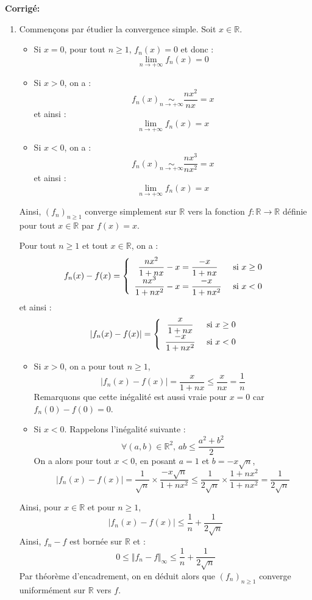 \documentclass[a4paper,twoside,french,11pt]{VcCours}
\newcommand{\corr}{\textbf{Corrigé:}}
\begin{document}
\corr \begin{enumerate}
\item Commençons par étudier la convergence simple. Soit $x \in \mathbb{R}$.
\begin{itemize}
\item Si $x=0$, pour tout $n \geq 1$, $f_n(x)=0$ et donc :
$$ \lim_{n \rightarrow + \infty} f_n(x)=0$$
\item Si $x>0$, on a :
$$ f_n(x) \underset{n \rightarrow + \infty}{\sim} \dfrac{nx^2}{nx} = x$$
et ainsi :
$$ \lim_{n \rightarrow + \infty} f_n(x)=x$$
\item Si $x<0$, on a :
$$ f_n(x) \underset{n \rightarrow + \infty}{\sim} \dfrac{nx^3}{nx^2} = x$$
et ainsi :
$$ \lim_{n \rightarrow + \infty} f_n(x)=x$$
\end{itemize}
Ainsi, $(f_n)_{n \geq 1}$ converge simplement sur $\mathbb{R}$ vers la fonction $f : \mathbb{R} \rightarrow \mathbb{R}$ définie pour tout $x \in \mathbb{R}$ par $f(x)=x$.

\medskip

Pour tout $n \geq 1$ et tout $x \in \mathbb{R}$, on a :
$$ f_n(x)-f(x)= \left\lbrace \begin{array}{cl}
\dfrac{nx^2}{1+nx}-x = \dfrac{-x}{1+nx} & \hbox{ si } x \geq 0 \\
\dfrac{nx^3}{1+nx^2}-x =  \dfrac{-x}{1+nx^2}& \hbox{ si } x < 0 \\
\end{array}\right.$$
et ainsi :
$$ \vert f_n(x)-f(x) \vert = \left\lbrace \begin{array}{cl}
 \dfrac{x}{1+nx} & \hbox{ si } x \geq 0 \\
 \dfrac{-x}{1+nx^2}& \hbox{ si } x < 0 \\
\end{array}\right.$$
\begin{itemize}
\item Si $x > 0$, on a pour tout $n \geq 1$,
$$  \vert f_n(x)-f(x) \vert = \dfrac{x}{1+nx} \leq \dfrac{x}{nx} = \dfrac{1}{n}$$
Remarquons que cette inégalité est aussi vraie pour $x=0$ car $f_n(0)-f(0)=0$.
\item Si $x<0$. Rappelons l'inégalité suivante :
$$ \forall (a,b) \in \mathbb{R}^2, \, ab \leq \dfrac{a^2+b^2}{2}$$
On a alors pour tout $x<0$, en posant $a=1$ et $b=-x \sqrt{n}$,
$$ \vert f_n(x)-f(x) \vert = \dfrac{1}{\sqrt{n}} \times \dfrac{ -x \sqrt{n}}{1+nx^2} \leq \dfrac{1}{2\sqrt{n}} \times \dfrac{1+nx^2}{1+nx^2} = \dfrac{1}{2\sqrt{n}}$$
\end{itemize}
Ainsi, pour $x \in \mathbb{R}$ et pour $n \geq 1$, 
$$  \vert f_n(x)-f(x) \vert \leq \dfrac{1}{n} + \dfrac{1}{2\sqrt{n}}$$
Ainsi, $f_n-f$ est bornée sur $\mathbb{R}$ et :
$$ 0 \leq \Vert f_n-f \Vert_{\infty} \leq \dfrac{1}{n} + \dfrac{1}{2\sqrt{n}}$$
Par théorème d'encadrement, on en déduit alors que $(f_n)_{n \geq 1}$ converge uniformément sur $\mathbb{R}$ vers $f$.


\end{enumerate}
\end{document}
